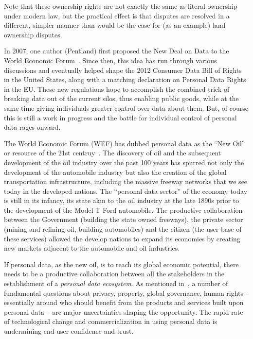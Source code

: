 Note that these ownership rights are not exactly the same as literal ownership under modern law, but the practical effect is that disputes are resolved in a different, simpler manner than would be the case for (as an example) land ownership disputes.

In 2007, one author (Pentland) first proposed the New Deal on Data to the World Economic Forum~\cite{WEF2011}. 
Since then, this idea has run through various discussions and eventually helped shape the 2012 Consumer Data Bill of Rights in the United States, along with a matching declaration on Personal Data Rights in the EU.
These new regulations hope to accomplish the combined trick of breaking data out of the current silos, thus enabling public goods, while at the same time giving individuals greater control over data about them.
But, of course this is still a work in progress and the battle for individual control of personal data rages onward.


The World Economic Forum (WEF) has dubbed personal data as the ``New Oil'' or resource of the 21st centruy~\cite{WEF2011}.
The discovery of oil and the subsequent development of the oil industry over the past 100 years has spurred not only the development of the automobile industry but also the creation of the global transportation infrastructure, including the massive freeway networks that we see today in the developed nations.
The ``personal data sector'' of the economy today is still in its infancy, its state akin to the oil industry at the late 1890s prior to the development of the Model-T Ford automobile.
The productive collaboration between the Government (building the state owned freeways), the private sector (mining and refining oil, building automobiles) and the citizen (the user-base of these services) allowed the develop nations to expand its economies by creating new markets adjacent to the automobile and oil industries.

If personal data, as the new oil, is to reach  its global economic potential, there needs to be a productive collaboration between all the stakeholders in the establishment of a {\em personal data ecosystem}.
As mentioned in~\cite{WEF2011}, a number of fundamental questions about privacy, property, 
global governance, human rights -- essentially around who should benefit from the products and services built upon personal data -- are major uncertainties shaping the opportunity.
The rapid rate of technological change and commercialization in using personal data is undermining end user confidence and trust.

